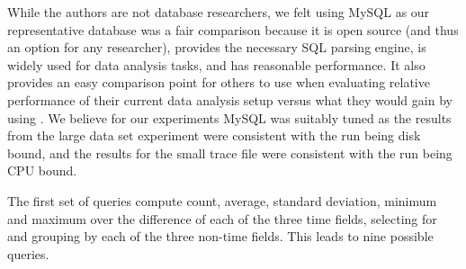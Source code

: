 While the authors are not database researchers, we felt using MySQL as
our representative database was a fair comparison because it is open
source (and thus an option for any researcher), provides the necessary
SQL parsing engine, is widely used for data analysis tasks, and has
reasonable performance.  It also provides an easy comparison point for
others to use when evaluating relative performance of their current
data analysis setup versus what they would gain by using
\DataSeries{}.  We believe for our experiments MySQL was suitably
tuned as the results from the large data set experiment were consistent with
the run being disk bound, and the results for the small trace file were
consistent with the run being CPU bound.

The first set of queries compute count, average, standard deviation, minimum and
maximum over the difference of each of the three time fields,
selecting for and grouping by each of the three non-time fields.  This
leads to nine possible queries.%


